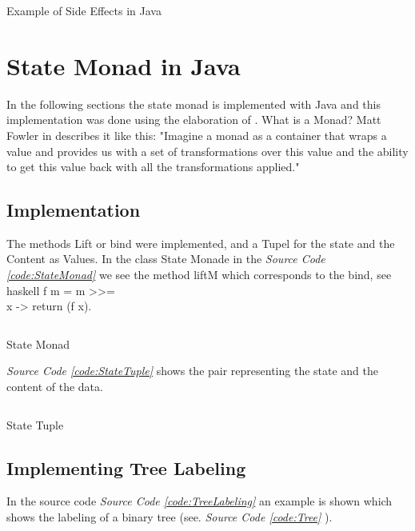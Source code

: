 \documentclass[a4paper,12pt,twoside]{scrreprt}
\begin{document}
\begin{listing}[ht]
    \inputminted[fontsize=\footnotesize,linenos,breaklines,breakanywhere]{java}{./code/SideEffects.java}
    \caption[Example of Side Effects in Java]{Example of Side Effects in Java}
    \label{code:Effects}
\end{listing}

\clearpage

\section{State Monad in Java}
In the following sections the state monad is implemented with Java and this implementation was done using the elaboration of \cite{muzietto_state_2014}.
\newline
What is a Monad? 
Matt Fowler in \cite{fowler_understanding_2015} describes it like this:
"Imagine a monad as a container that wraps a value and provides us with a set of transformations over this value and the ability to get this value back with all the transformations applied."

\subsection{Implementation}
The methods Lift or bind were implemented, and a Tupel for the state and the Content as Values.
In the class State Monade in the  \emph{Source Code \ref{code:StateMonad}} we see the method liftM which corresponds to the bind, see haskell f m = m >>= \\x -> return (f x).

\begin{listing}[ht]
    \inputminted[fontsize=\footnotesize,linenos,breaklines,breakanywhere]{java}{./code/statemonad/StateMonad.java}
    \caption[State Monad]{State Monad}
    \label{code:StateMonad}
\end{listing}
\clearpage

\emph{Source Code \ref{code:StateTuple}} shows the pair representing the state and the content of the data.

\begin{listing}[ht]
    \inputminted[fontsize=\footnotesize,linenos,breaklines,breakanywhere]{java}{./code/statemonad/StateTuple.java}
    \caption[State Tuple]{State Tuple}
    \label{code:StateTuple}
\end{listing}
\clearpage

\subsection{Implementing Tree Labeling}
In the source code \emph{Source Code \ref{code:TreeLabeling}} an example is shown which shows the labeling of a binary tree (see. \emph{Source Code \ref{code:Tree}} ).
\end{document}
